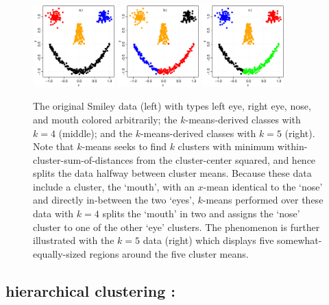 \begin{figure}[H]
  \centering
    \includegraphics[width=0.28\textwidth]{images/actual_smiley.pdf}
    \quad
    \includegraphics[width=0.28\textwidth]{images/kmeans_smiley.pdf}
    \quad
    \includegraphics[width=0.28\textwidth]{images/kmeans_5_smiley.pdf}
  \caption{The original Smiley data (left) with types left eye, right eye, nose, and mouth colored arbitrarily; the $k$-means-derived classes with $k=4$ (middle); and the $k$-means-derived classes with $k=5$ (right). Note that $k$-means seeks to find $k$ clusters with minimum within-cluster-sum-of-distances from the cluster-center squared, and hence splits the data halfway between cluster means.  Because these data include a cluster, the `mouth', with an $x$-mean identical to the `nose' and directly in-between the two `eyes', $k$-means performed over these data with $k=4$ splits the `mouth' in two and assigns the `nose' cluster to one of the other `eye' clusters.  The phenomenon is further illustrated with the $k=5$ data (right) which displays five somewhat-equally-sized regions around the five cluster means.} 
\end{figure}

\subsection{hierarchical clustering :}

